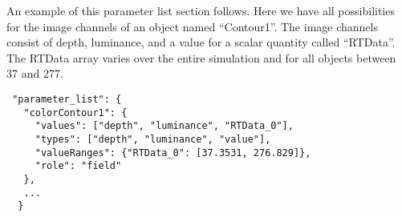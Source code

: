 An example of this parameter list section follows. Here we have all possibilities for the image channels of an object named ``Contour1''. The image channels consist of depth, luminance, and a value for a scalar quantity called ``RTData''. The RTData array varies over the entire simulation and for all objects between 37 and 277.

\begin{verbatim}
 "parameter_list": {
   "colorContour1": { 
     "values": ["depth", "luminance", "RTData_0"],
     "types": ["depth", "luminance", "value"],
     "valueRanges": {"RTData_0": [37.3531, 276.829]},
     "role": "field"
   },
   ...
  }
\end{verbatim}

